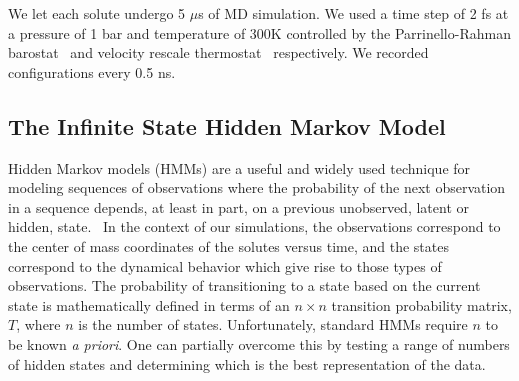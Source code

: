\documentclass{article}
\begin{document}
  We let each solute undergo 5 $\mu$s of MD simulation. We used a time step of 2 fs
  at a pressure of 1 bar and temperature of 300K controlled by the Parrinello-Rahman 
  barostat~\cite{???} and velocity rescale thermostat~\cite{???} respectively. We recorded configurations every 0.5 ns.

  \subsection{The Infinite State Hidden Markov Model}\label{method:IHMM}
  
  Hidden Markov models (HMMs) are a useful and widely used technique for modeling
  sequences of observations where the probability of the next observation in a 
  sequence depends, at least in part, on a previous unobserved, latent or hidden,
  state.~\cite{beal_infinite_2002} In the context of our simulations, the observations
  correspond to the center of mass coordinates of the solutes versus time, and the
  states correspond to the dynamical behavior which give rise to those types
  of observations. The probability of transitioning to a state based on the current
  state is mathematically defined in terms of an $n\times n$ transition probability
  matrix, $T$, where $n$ is the number of states. Unfortunately, standard HMMs 
  require $n$ to be known \textit{a priori}. One can partially overcome this by 
  testing a range of numbers of hidden states and determining which is the best 
  representation of the data.
  
\end{document}
